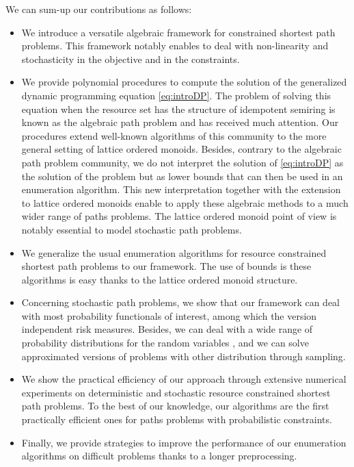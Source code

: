 \documentclass[11pt]{amsart}
\theoremstyle{plain}
\theoremstyle{remark}
\begin{document}
We can sum-up our contributions as follows:
\begin{itemize}
	\item We introduce a versatile algebraic framework for constrained shortest path problems. This framework notably enables to deal with non-linearity and stochasticity in the objective and in the constraints. 
	\item We provide polynomial procedures to compute the solution of the generalized dynamic programming equation \eqref{eq:introDP}. The problem of solving this equation when the resource set has the structure of idempotent semiring is known as the algebraic path problem and has received much attention. Our procedures extend well-known algorithms of this community to the more general setting of lattice ordered monoids. Besides, contrary to the algebraic path problem community, we do not interpret the solution of \eqref{eq:introDP} as the solution of the problem but as lower bounds that can then be used in an enumeration algorithm. This new interpretation together with the extension to lattice ordered monoids enable to apply these algebraic methods to a much wider range of paths problems. The lattice ordered monoid point of view is notably essential to model stochastic path problems.
\item We generalize the usual enumeration algorithms for resource constrained shortest path problems to our framework. The use of bounds is these algorithms is easy thanks to the lattice ordered monoid structure.  
	\item Concerning stochastic path problems, we show that our framework can deal with most probability functionals of interest, among which the version independent risk measures. Besides, we can deal with a wide range of probability distributions for the random variables , and we can solve approximated versions of problems with other distribution through sampling.
	\item We show the practical efficiency of our approach through extensive numerical experiments on deterministic and stochastic resource constrained shortest path problems. To the best of our knowledge, our algorithms are the first practically efficient ones for paths problems with probabilistic constraints. 
	\item Finally, we provide strategies to improve the performance of our enumeration algorithms on difficult problems thanks to a longer preprocessing.
\end{itemize}
\end{document}
